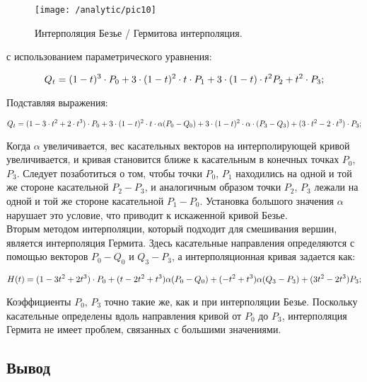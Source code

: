 \begin{figure}[H]
\center
\texttt{[image: /analytic/pic10]}
\caption{Интерполяция Безье / Гермитова интерполяция.}
\end{figure}

с использованием параметрического уравнения:

\begin{equation}
    Q_{t} = (1 - t)^3 \cdot P_{0} + 3 \cdot (1 - t)^2 \cdot t \cdot P_{1} + 3 \cdot (1 - t) \cdot t^2 P_{2} + t^2 \cdot P_{3}; \notag 
\end{equation}

Подставляя выражения:

\begin{equation}
    Q_{t} = (1 - 3 \cdot t^2 + 2 \cdot t^3) \cdot P_{0} + 3 \cdot (1 - t)^2 \cdot t \cdot \alpha (P_{0} - Q_{0}) + 3 \cdot (1 - t)^2 \cdot \alpha \cdot (P_{3} - Q_{3}) + (3 \cdot t^2 - 2 \cdot t^3) \cdot P_{3}; \notag
\end{equation}

Когда $\alpha$ увеличивается, вес касательных векторов на интерполирующей кривой увеличивается, и кривая становится ближе к касательным в конечных точках $P_{0}$, $P_{3}$. Следует позаботиться о том, чтобы точки $P_{0}$, $P_{1}$ находились на одной и той же стороне касательной $P_{2}-P_{3}$, и аналогичным образом точки $P_{2}$, $P_{3}$ лежали на одной и той же стороне касательной $P_{1}-P_{0}$. Установка большого значения $\alpha$ нарушает это условие, что приводит к искаженной кривой Безье.\\

Вторым методом интерполяции, который подходит для смешивания вершин, является интерполяция Гермита. Здесь касательные направления определяются с помощью векторов $P_{0}-Q_{0}$ и $Q_{3}-P_{3}$, а интерполяционная кривая задается как:

\begin{equation}
    H(t) = (1 - 3t^2 + 2t^3) \cdot P_{0} + (t - 2t^2 + t^3)\alpha(P_{0} - Q_{0}) \\
     + (-t^2 + t^3)\alpha(Q_{3} - P_{3}) + (3t^2 - 2t^3)P_{3}; \notag 
\end{equation}

Коэффициенты $P_{0}$, $P_{3}$ точно такие же, как и при интерполяции Безье. Поскольку касательные определены вдоль направления кривой от $P_{0}$ до $P_{3}$, интерполяция Гермита не имеет проблем, связанных с большими значениями.

\subsection{Вывод}\label{subsec:analytic1.4}

